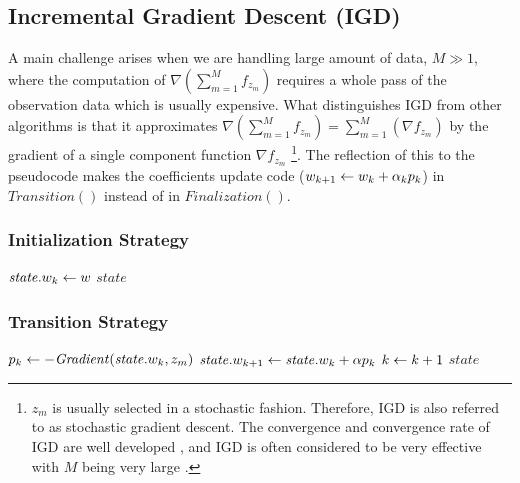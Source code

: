 \subsection{Incremental Gradient Descent (IGD)}
A main challenge arises when we are handling large amount of data, $M \gg 1$, where the computation of $\nabla (\sum_{m=1}^M f_{z_m})$ requires a whole pass of the observation data which is usually expensive.
What distinguishes IGD from other algorithms is that it approximates  $\nabla (\sum_{m=1}^M f_{z_m}) = \sum_{m=1}^M (\nabla f_{z_m})$ by the gradient of a single component function $\nabla f_{z_m}$
\footnote{$z_m$ is usually selected in a stochastic fashion.
Therefore, IGD is also referred to as stochastic gradient descent.
The convergence and convergence rate of IGD are well developed \cite{springerlink:10.1007/s10107-011-0472-0}, and IGD is often considered to be very effective with $M$ being very large \cite{DBLP:conf/nips/BottouB07}.}.
The reflection of this to the pseudocode makes the coefficients update code ($w_{k+1} \leftarrow w_k + \alpha_k p_k$) in $\mathit{Transition}()$ instead of in $\mathit{Finalization}()$.

\subsubsection{Initialization Strategy}
\begin{algorithm} \label{alg:initialization-igd}
\begin{algorithmic}[1]
    \State $\mathit{state}.w_k \leftarrow w$
    \State \Return $\mathit{state}$
\end{algorithmic}
\end{algorithm}

\subsubsection{Transition Strategy}
\begin{algorithm} \label{alg:transition-igd}
\begin{algorithmic}[1]
    \State $p_k \leftarrow - \mathit{Gradient}(\mathit{state}.w_k, z_m)$
    \State $\mathit{state}.w_{k+1} \leftarrow \mathit{state}.w_k + \alpha p_k$
    \State $k \leftarrow k + 1$
    \State \Return $\mathit{state}$
\end{algorithmic}
\end{algorithm}

